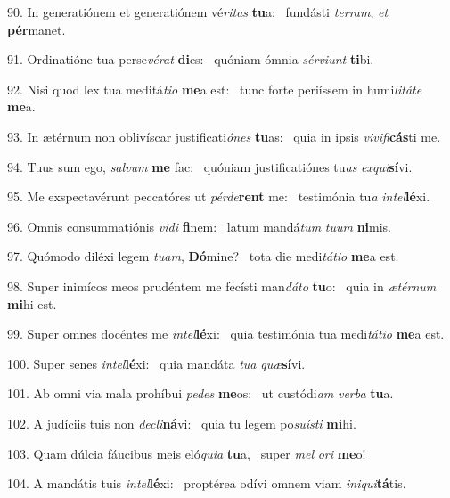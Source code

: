 90. In generatiónem et generatiónem vé\textit{ri}\textit{tas} \textbf{tu}a: \ast\  fundásti \textit{ter}\textit{ram}, \textit{et} \textbf{pér}manet.\

91. Ordinatióne tua perse\textit{vé}\textit{rat} \textbf{di}es: \ast\  quóniam ómnia \textit{sér}\textit{vi}\textit{unt} \textbf{ti}bi.\

92. Nisi quod lex tua meditá\textit{ti}\textit{o} \textbf{me}a est: \ast\  tunc forte periíssem in humi\textit{li}\textit{tá}\textit{te} \textbf{me}a.\

93. In ætérnum non oblivíscar justificati\textit{ó}\textit{nes} \textbf{tu}as: \ast\  quia in ipsis \textit{vi}\textit{vi}\textit{fi}\textbf{cás}ti me.\

94. Tuus sum ego, \textit{sal}\textit{vum} \textbf{me} fac: \ast\  quóniam justificatiónes tu\textit{as} \textit{ex}\textit{qui}\textbf{sí}vi.\

95. Me exspectavérunt peccatóres ut \textit{pér}\textit{de}\textbf{rent} me: \ast\  testimónia tu\textit{a} \textit{in}\textit{tel}\textbf{lé}xi.\

96. Omnis consummatiónis \textit{vi}\textit{di} \textbf{fi}nem: \ast\  latum mandá\textit{tum} \textit{tu}\textit{um} \textbf{ni}mis.\

97. Quómodo diléxi legem \textit{tu}\textit{am}, \textbf{Dó}mine? \ast\  tota die medi\textit{tá}\textit{ti}\textit{o} \textbf{me}a est.\

98. Super inimícos meos prudéntem me fecísti man\textit{dá}\textit{to} \textbf{tu}o: \ast\  quia in \textit{æ}\textit{tér}\textit{num} \textbf{mi}hi est.\

99. Super omnes docéntes me \textit{in}\textit{tel}\textbf{lé}xi: \ast\  quia testimónia tua medi\textit{tá}\textit{ti}\textit{o} \textbf{me}a est.\

100. Super senes \textit{in}\textit{tel}\textbf{lé}xi: \ast\  quia mandáta \textit{tu}\textit{a} \textit{quæ}\textbf{sí}vi.\

101. Ab omni via mala prohíbui \textit{pe}\textit{des} \textbf{me}os: \ast\  ut custódi\textit{am} \textit{ver}\textit{ba} \textbf{tu}a.\

102. A judíciis tuis non \textit{de}\textit{cli}\textbf{ná}vi: \ast\  quia tu legem po\textit{su}\textit{ís}\textit{ti} \textbf{mi}hi.\

103. Quam dúlcia fáucibus meis eló\textit{qui}\textit{a} \textbf{tu}a, \ast\  super \textit{mel} \textit{o}\textit{ri} \textbf{me}o!\

104. A mandátis tuis \textit{in}\textit{tel}\textbf{lé}xi: \ast\  proptérea odívi omnem viam \textit{in}\textit{i}\textit{qui}\textbf{tá}tis.\

